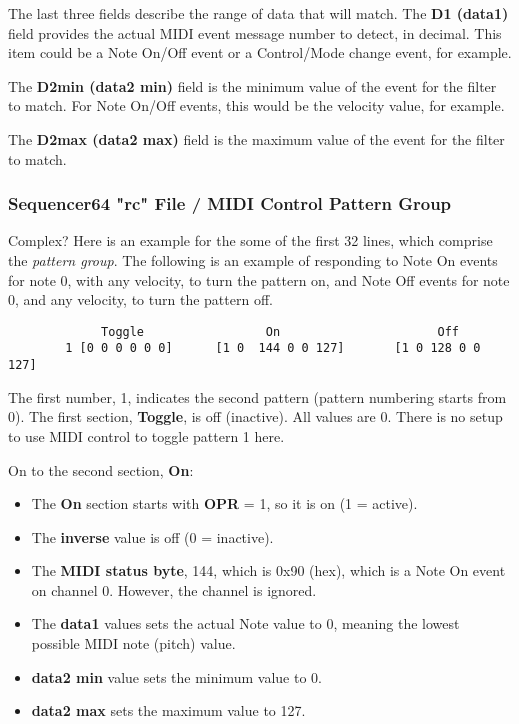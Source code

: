    The last three fields describe the range of data that will match.  The
   \textbf{D1 (data1)} field provides the actual MIDI event message number to
   detect, in decimal.  This item could be a Note On/Off event or a
   Control/Mode change event, for example.

   The \textbf{D2min (data2 min)} field is the minimum value of the event for
   the filter to match. For Note On/Off events, this would be the velocity
   value, for example.

   The \textbf{D2max (data2 max)} field is the maximum value of the event for
   the filter to match.

\subsubsection{Sequencer64 "rc" File / MIDI Control Pattern Group}
\label{subsubsec:seq64_rc_file_midi_control_pattern_group}

   Complex?  Here is an example for the some of the first 32 lines, which
   comprise the \textsl{pattern group}.
   The following is an example of responding
   to Note On events for note 0, with any velocity, to turn the pattern on,
   and Note Off events for note 0, and any velocity, to turn the pattern
   off.

   \begin{verbatim}
             Toggle                 On                      Off
        1 [0 0 0 0 0 0]      [1 0  144 0 0 127]       [1 0 128 0 0 127]
   \end{verbatim}

   The first number, 1, indicates the second pattern (pattern numbering starts
   from 0).
   The first section, \textbf{Toggle}, is off (inactive).  All values are 0.
   There is no setup to use MIDI control to toggle pattern 1 here.
   
   On to the second section, \textbf{On}:

   \begin{itemize}
      \item The \textbf{On} section starts with \textbf{OPR} = 1,
         so it is on (1 = active).
      \item The \textbf{inverse} value is off (0 = inactive).
      \item The \textbf{MIDI status byte}, 144, which is 0x90 (hex), which
         is a Note On event on channel 0.  However, the channel is ignored.
      \item The \textbf{data1} values sets the actual Note value to 0,
         meaning the lowest possible MIDI note (pitch) value.
      \item \textbf{data2 min} value sets the minimum value to 0.
      \item \textbf{data2 max} sets the maximum value to 127.
   \end{itemize}

